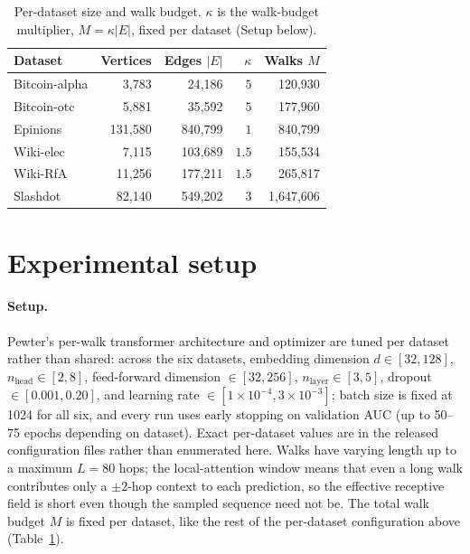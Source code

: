 \documentclass[sigconf, review, anonymous]{acmart}
\theoremstyle{plain}
\theoremstyle{definition}
\begin{document}
\begin{table}[h!]
\centering
\scriptsize
\caption{Per-dataset size and walk budget. $\kappa$ is the walk-budget multiplier, $M=\kappa|E|$, fixed per dataset (Setup below).}
\label{tab:dataset-walks}
\begin{tabular}{lrrrr}
\toprule
Dataset & Vertices & Edges $|E|$ & $\kappa$ & Walks $M$ \\
\midrule
Bitcoin-alpha & 3{,}783 & 24{,}186 & $5$ & 120{,}930 \\
Bitcoin-otc & 5{,}881 & 35{,}592 & $5$ & 177{,}960 \\
Epinions & 131{,}580 & 840{,}799 & $1$ & 840{,}799 \\
Wiki-elec & 7{,}115 & 103{,}689 & $1.5$ & 155{,}534 \\
Wiki-RfA & 11{,}256 & 177{,}211 & $1.5$ & 265{,}817 \\
Slashdot & 82{,}140 & 549{,}202 & $3$ & 1{,}647{,}606 \\
\bottomrule
\end{tabular}
\end{table}
\section{Experimental setup}
\label{sec:setup}
\paragraph{Setup.} Pewter's per-walk transformer architecture and optimizer are tuned per dataset rather than shared: across the six datasets, embedding dimension $d\in[32,128]$, $n_\text{head}\in[2,8]$, feed-forward dimension $\in[32,256]$, $n_\text{layer}\in[3,5]$, dropout $\in[0.001,0.20]$, and learning rate $\in[1\times10^{-4},3\times10^{-3}]$; batch size is fixed at 1024 for all six, and every run uses early stopping on validation AUC (up to 50--75 epochs depending on dataset). Exact per-dataset values are in the released configuration files rather than enumerated here. Walks have varying length up to a maximum $L=80$ hops; the local-attention window means that even a long walk contributes only a $\pm2$-hop context to each prediction, so the effective receptive field is short even though the sampled sequence need not be. The total walk budget $M$ is fixed per dataset, like the rest of the per-dataset configuration above (Table~\ref{tab:dataset-walks}).
\end{document}
